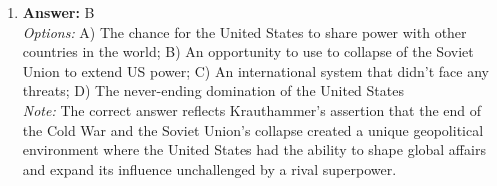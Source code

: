 \documentclass[12pt]{article}
\begin{document}
\begin{enumerate}[label=\arabic*.]
\\ \textit{Note:} The Security Council holds real power within the United Nations because it is the primary body responsible for maintaining international peace and security, possessing the authority to make binding decisions, impose sanctions, and authorize military action, which other UN bodies cannot enforce.
\item \textbf{Answer:} B
\\ \textit{Options:} A) The chance for the United States to share power with other countries in the world; B) An opportunity to use to collapse of the Soviet Union to extend US power; C) An international system that didn't face any threats; D) The never-ending domination of the United States
\\ \textit{Note:} The correct answer reflects Krauthammer's assertion that the end of the Cold War and the Soviet Union's collapse created a unique geopolitical environment where the United States had the ability to shape global affairs and expand its influence unchallenged by a rival superpower.
\end{enumerate}
\end{document}
